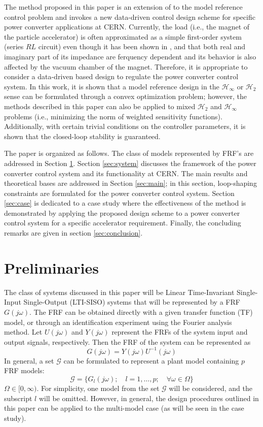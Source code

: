 \documentclass[a4paper, 10pt, conference]{ieeeconf}
\newcommand{\jo}{(j\omega)}
\begin{document}
The method proposed in this paper is an extension of \cite{KK16} to the model reference control problem and invokes a new data-driven control design scheme for specific power converter applications at CERN. Currently, the load (i.e., the magnet of the particle accelerator) is often approximated as a simple first-order system (series $RL$ circuit) even though it has been shown in \cite{Shafer1}, \cite{Shafer2} and \cite{Ravaioli1} that both real and imaginary part of its impedance are ferquency dependent and its behavior is also affected by the vacuum chamber of the magnet. Therefore, it is appropriate to consider a data-driven based design to regulate the power converter control system.  In this work, it is shown that a model reference design in the $\mathcal{H}_\infty$ or $\mathcal{H}_2$ sense can be formulated through a convex optimization problem; however, the methods described in this paper can also be applied to mixed $\mathcal{H}_2$ and $\mathcal{H}_\infty$ problems (i.e., minimizing the norm of weighted sensitivity functions). Additionally, with certain trivial conditions on the controller parameters, it is shown that the closed-loop stability is guaranteed. 

The paper is organized as follows. The class of models represented by FRF's are addressed in Section \ref{sec:prelim}. Section \ref{sec:system} discusses the framework of the power converter control system and its functionality at CERN. The main results and theoretical bases are addressed in Section \ref{sec:main}; in this section, loop-shaping constraints are formulated for the power converter control system. Section \ref{sec:case} is dedicated to a case study where the effectiveness of the method is demonstrated by applying the proposed design scheme to a power converter control system for a specific accelerator requirement. Finally, the concluding remarks are given in section \ref{sec:conclusion}.

\section{Preliminaries}
\label{sec:prelim}
The class of systems discussed in this paper will be Linear Time-Invariant Single-Input Single-Output (LTI-SISO) systems that will be represented by a FRF $G\jo$.  The FRF can be obtained directly with a given transfer function (TF) model, or through an identification experiment using the Fourier analysis method. Let $U\jo$ and $Y\jo$ represent the FRFs of the system input and output signals, respectively. Then the FRF of the system can be represented as 
\begin{equation}
G\jo = Y\jo U^{-1}\jo
\end{equation}
In general, a set $\mathcal{G}$ can be formulated to represent a plant model containing $p$ FRF models:
\begin{equation}
\mathcal{G} = \{G_l\jo; \quad l=1,\ldots,p; \quad \forall \omega \in \Omega\}
\end{equation} 
$\Omega \in [0,\infty)$. For simplicity, one model from the set $\mathcal{G}$ will be considered, and the subscript $l$ will be omitted. However, in general, the design procedures outlined in this paper can be applied to the multi-model case (as will be seen in the case study). 
\end{document}
